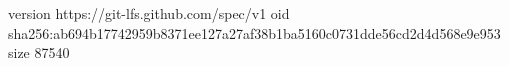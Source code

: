 version https://git-lfs.github.com/spec/v1
oid sha256:ab694b17742959b8371ee127a27af38b1ba5160c0731dde56cd2d4d568e9e953
size 87540
